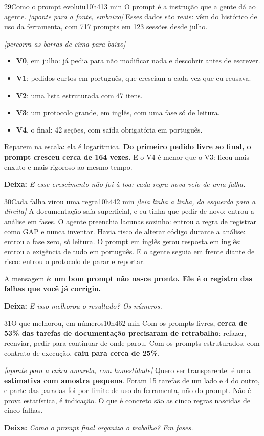\documentclass[11pt,a4paper]{article}
\newcommand{\acao}[1]{{\color{ouroMB!75!black}\small\itshape [#1]}}
\newcommand{\deixa}[1]{\par{\color{verdeMB}\small\bfseries \faLongArrowAltRight\; Deixa:} {\small\itshape #1}}
\begin{document}
\begin{slide}{29}{Como o prompt evoluiu}{10h41}{3 min}
O prompt é a instrução que a gente dá ao agente. \acao{aponte para a fonte, embaixo} Esses dados são reais: vêm do histórico de uso da ferramenta, com 717 prompts em 123 sessões desde julho.

\acao{percorra as barras de cima para baixo}
\begin{itemize}
  \item \textbf{V0}, em julho: já pedia para não modificar nada e descobrir antes de escrever.
  \item \textbf{V1}: pedidos curtos em português, que cresciam a cada vez que eu reusava.
  \item \textbf{V2}: uma lista estruturada com 47 itens.
  \item \textbf{V3}: um protocolo grande, em inglês, com uma fase só de leitura.
  \item \textbf{V4}, o final: 42 seções, com saída obrigatória em português.
\end{itemize}

Reparem na escala: ela é logarítmica. \textbf{Do primeiro pedido livre ao final, o prompt cresceu cerca de 164 vezes.} E o V4 é menor que o V3: ficou mais enxuto e mais rigoroso ao mesmo tempo.
\deixa{E esse crescimento não foi à toa: cada regra nova veio de uma falha.}
\end{slide}

\begin{slide}{30}{Cada falha virou uma regra}{10h44}{2 min}
\acao{leia linha a linha, da esquerda para a direita}
A documentação saía superficial, e eu tinha que pedir de novo: entrou a análise em fases. O agente preenchia lacunas sozinho: entrou a regra de registrar como GAP e nunca inventar. Havia risco de alterar código durante a análise: entrou a fase zero, só leitura. O prompt em inglês gerou resposta em inglês: entrou a exigência de tudo em português. E o agente seguia em frente diante de risco: entrou o protocolo de parar e reportar.

A mensagem é: \textbf{um bom prompt não nasce pronto. Ele é o registro das falhas que você já corrigiu.}
\deixa{E isso melhorou o resultado? Os números.}
\end{slide}

\begin{slide}{31}{O que melhorou, em números}{10h46}{2 min}
Com os prompts livres, \textbf{cerca de 53\% das tarefas de documentação precisaram de retrabalho}: refazer, reenviar, pedir para continuar de onde parou. Com os prompts estruturados, com contrato de execução, \textbf{caiu para cerca de 25\%}.

\acao{aponte para a caixa amarela, com honestidade} Quero ser transparente: é uma \textbf{estimativa com amostra pequena}. Foram 15 tarefas de um lado e 4 do outro, e parte das paradas foi por limite de uso da ferramenta, não do prompt. Não é prova estatística, é indicação. O que é concreto são as cinco regras nascidas de cinco falhas.
\deixa{Como o prompt final organiza o trabalho? Em fases.}
\end{slide}
\end{document}
